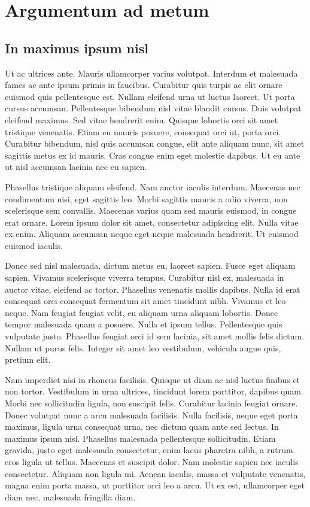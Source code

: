 \chapter{Argumentum ad metum}

\section{In maximus ipsum nisl}
Ut ac ultrices ante. Mauris ullamcorper varius volutpat. Interdum et malesuada fames ac ante ipsum primis in faucibus. Curabitur quis turpis ac elit ornare euismod quis pellentesque est. Nullam eleifend urna ut luctus laoreet. Ut porta cursus accumsan. Pellentesque bibendum nisl vitae blandit cursus. Duis volutpat eleifend maximus. Sed vitae hendrerit enim. Quisque lobortis orci sit amet tristique venenatis. Etiam eu mauris posuere, consequat orci ut, porta orci. Curabitur bibendum, nisl quis accumsan congue, elit ante aliquam nunc, sit amet sagittis metus ex id mauris. Cras congue enim eget molestie dapibus. Ut eu ante ut nisl accumsan lacinia nec eu sapien.

Phasellus tristique aliquam eleifend. Nam auctor iaculis interdum. Maecenas nec condimentum nisi, eget sagittis leo. Morbi sagittis mauris a odio viverra, non scelerisque sem convallis. Maecenas varius quam sed mauris euismod, in congue erat ornare. Lorem ipsum dolor sit amet, consectetur adipiscing elit. Nulla vitae ex enim. Aliquam accumsan neque eget neque malesuada hendrerit. Ut euismod euismod iaculis.

Donec sed nisl malesuada, dictum metus eu, laoreet sapien. Fusce eget aliquam sapien. Vivamus scelerisque viverra tempus. Curabitur nisl ex, malesuada in auctor vitae, eleifend ac tortor. Phasellus venenatis mollis dapibus. Nulla id erat consequat orci consequat fermentum sit amet tincidunt nibh. Vivamus et leo neque. Nam feugiat feugiat velit, eu aliquam urna aliquam lobortis. Donec tempor malesuada quam a posuere. Nulla et ipsum tellus. Pellentesque quis vulputate justo. Phasellus feugiat orci id sem lacinia, sit amet mollis felis dictum. Nullam ut purus felis. Integer sit amet leo vestibulum, vehicula augue quis, pretium elit.

Nam imperdiet nisi in rhoncus facilisis. Quisque ut diam ac nisl luctus finibus et non tortor. Vestibulum in urna ultrices, tincidunt lorem porttitor, dapibus quam. Morbi nec sollicitudin ligula, non suscipit felis. Curabitur lacinia feugiat ornare. Donec volutpat nunc a arcu malesuada facilisis. Nulla facilisis, neque eget porta maximus, ligula urna consequat urna, nec dictum quam ante sed lectus. In maximus ipsum nisl. Phasellus malesuada pellentesque sollicitudin. Etiam gravida, justo eget malesuada consectetur, enim lacus pharetra nibh, a rutrum eros ligula ut tellus. Maecenas et suscipit dolor. Nam molestie sapien nec iaculis consectetur. Aliquam non ligula mi. Aenean iaculis, massa et vulputate venenatis, magna enim porta massa, ut porttitor orci leo a arcu. Ut ex est, ullamcorper eget diam nec, malesuada fringilla diam.

